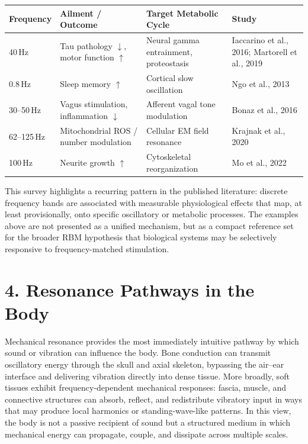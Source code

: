 \documentclass[11pt]{article}
\begin{document}
\begin{table}[htbp]
\centering
\renewcommand{\arraystretch}{1.2}
\begin{tabular}{|p{2.2cm}|p{4.2cm}|p{4.2cm}|p{3.2cm}|}
\hline
\textbf{Frequency} & \textbf{Ailment / Outcome} & \textbf{Target Metabolic Cycle} & \textbf{Study} \\
\hline
40\,Hz & Tau pathology $\downarrow$, motor function $\uparrow$ & Neural gamma entrainment, proteostasis & Iaccarino et al., 2016; Martorell et al., 2019 \\
\hline
0.8\,Hz & Sleep memory $\uparrow$ & Cortical slow oscillation & Ngo et al., 2013 \\
\hline
30--50\,Hz & Vagus stimulation, inflammation $\downarrow$ & Afferent vagal tone modulation & Bonaz et al., 2016 \\
\hline
62--125\,Hz & Mitochondrial ROS / number modulation & Cellular EM field resonance & Krajnak et al., 2020 \\
\hline
100\,Hz & Neurite growth $\uparrow$ & Cytoskeletal reorganization & Mo et al., 2022 \\
\hline
\end{tabular}
\end{table}

This survey highlights a recurring pattern in the published literature: discrete frequency bands are associated with measurable physiological effects that map, at least provisionally, onto specific oscillatory or metabolic processes. The examples above are not presented as a unified mechanism, but as a compact reference set for the broader RBM hypothesis that biological systems may be selectively responsive to frequency-matched stimulation.


\section{4. Resonance Pathways in the Body}

Mechanical resonance provides the most immediately intuitive pathway by which sound or vibration can influence the body. Bone conduction can transmit oscillatory energy through the skull and axial skeleton, bypassing the air--ear interface and delivering vibration directly into dense tissue. More broadly, soft tissues exhibit frequency-dependent mechanical responses: fascia, muscle, and connective structures can absorb, reflect, and redistribute vibratory input in ways that may produce local harmonics or standing-wave-like patterns. In this view, the body is not a passive recipient of sound but a structured medium in which mechanical energy can propagate, couple, and dissipate across multiple scales.
\end{document}
